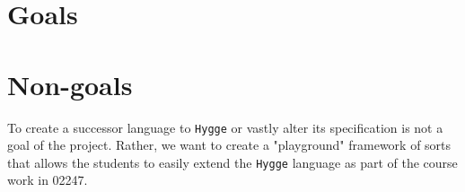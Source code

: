 \section{Goals}

\section{Non-goals}

To create a successor language to \texttt{Hygge} or vastly alter its specification is not a goal of the project. Rather, we want to create a
"playground" framework of sorts that allows the students to easily extend the \texttt{Hygge} language as part of the course work in 02247. 
